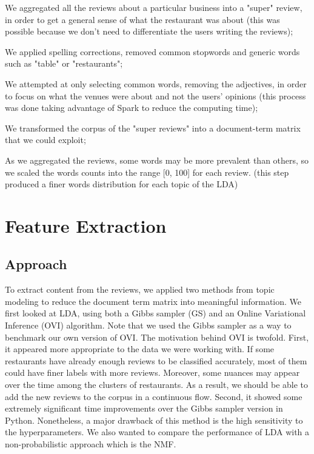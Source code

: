\documentclass[twoside]{article}
\begin{document}
\begin{multicols}{2}
\begin{compactitem}
    \item We aggregated all the reviews about a particular business into a "super" review, in order to get a general sense of what the restaurant was about (this was possible because we don't need to differentiate the users writing the reviews);
    \item We applied spelling corrections, removed common stopwords and generic words such as "table" or "restaurants";
    \item We attempted at only selecting common words, removing the adjectives, in order to focus on what the venues were about and not the users' opinions (this process was done taking advantage of Spark to reduce the computing time);
    \item We transformed the corpus of the "super reviews" into a document-term matrix that we could exploit;
    \item As we aggregated the reviews, some words may be more prevalent than others, so we scaled the words counts into the range [0, 100] for each review. (this step produced a finer words distribution for each topic of the LDA)
\end{compactitem}


\section{Feature Extraction}

\subsection{Approach}

To extract content from the reviews, we applied two methods from topic modeling to reduce the document term matrix into meaningful information. We first looked at LDA, using both a Gibbs sampler (GS) and an Online Variational Inference (OVI) algorithm. Note that we used the Gibbs sampler as a way to benchmark our own version of OVI. The motivation behind OVI is twofold. First, it appeared more appropriate to the data we were working with. If some restaurants have already enough reviews to be classified accurately, most of them could have finer labels with more reviews. Moreover, some nuances may appear over the time among the clusters of restaurants. As a result, we should be able to add the new reviews to the corpus in a continuous flow. Second, it showed some extremely significant time improvements over the Gibbs sampler version in Python. Nonetheless, a major drawback of this method is the high sensitivity to the hyperparameters. We also wanted to compare the performance of LDA with a non-probabilistic approach which is the NMF. 


\end{multicols}
\end{document}
